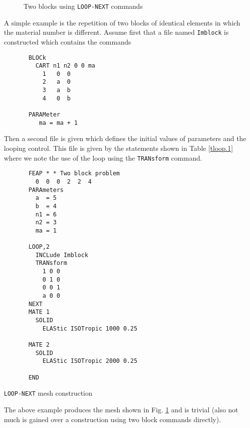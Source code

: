 \begin{figure}[hb!]
\epsfysize=2.2in
\centerline {\hfil {} \hfil}
\caption{Two blocks using \texttt{LOOP-NEXT} commands}
\label{floop.0}
\end{figure}
A simple example is the repetition of two blocks of identical elements
in which the material number is different.  Assume first that a file
named \texttt{Imblock} is constructed which contains the commands
\begin{verbatim}
       BLOCk
         CART n1 n2 0 0 ma
           1   0  0
           2   a  0
           3   a  b
           4   0  b

       PARAMeter
          ma = ma + 1

\end{verbatim}
Then a second file is given which defines the initial values of parameters
and the looping control.  This file is given by the statements shown in
Table \ref{tloop.1}
where we note the use of the loop using the \texttt{TRANsform} command. 
\begin{table}[ht!]
\begin{center}
\begin{verbatim}
       FEAP * * Two block problem
         0  0  0  2  2  4
       PARAmeters
         a  = 5
         b  = 4
         n1 = 6
         n2 = 3
         ma = 1
 
       LOOP,2
         INCLude Imblock
         TRANsform
           1 0 0
           0 1 0
           0 0 1
           a 0 0
       NEXT
       MATE 1
         SOLID
           ELAStic ISOTropic 1000 0.25

       MATE 2
         SOLID
           ELAStic ISOTropic 2000 0.25

       END
\end{verbatim}
\caption{\texttt{LOOP-NEXT} mesh construction}
\label{tloop.1}
\end{center}
\end{table}
The above example produces the mesh shown in Fig. \ref{floop.0} and
is trivial (also not much is gained over a construction
using two block commands directly).

